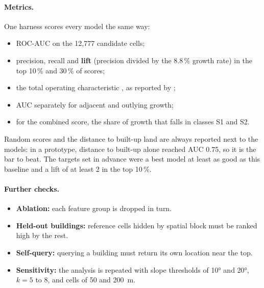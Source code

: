 \paragraph{Metrics.} One harness scores every model the same way:
\begin{itemize}
  \item ROC-AUC on the 12{,}777 candidate cells;
  \item precision, recall and \textbf{lift} (precision divided by the 8.8\,\% growth rate) in
        the top 10\,\% and 30\,\% of scores;
  \item the total operating characteristic \citep{pontius2014}, as reported by
        \citet{ahmadlou2016};
  \item AUC separately for adjacent and outlying growth;
  \item for the combined score, the share of growth that falls in classes S1 and S2.
\end{itemize}
Random scores and the distance to built-up land are always reported next to the models: in a
prototype, distance to built-up alone reached AUC 0.75, so it is the bar to beat. The targets set
in advance were a best model at least as good as this baseline and a lift of at least 2 in the
top 10\,\%.

\paragraph{Further checks.}
\begin{itemize}
  \item \textbf{Ablation:} each feature group is dropped in turn.
  \item \textbf{Held-out buildings:} reference cells hidden by spatial block must be ranked high
        by the rest.
  \item \textbf{Self-query:} querying a building must return its own location near the top.
  \item \textbf{Sensitivity:} the analysis is repeated with slope thresholds of \ang{10} and
        \ang{20}, $k=5$ to 8, and cells of 50 and \SI{200}{\m}.
\end{itemize}
